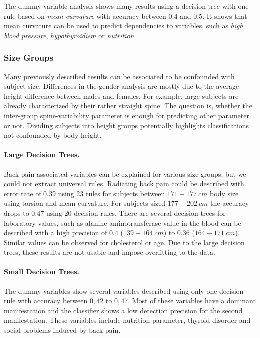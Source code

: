 \documentclass[a4paper,twoside]{style/article}
\begin{document}
The dummy variable analysis shows many results using a decision tree with one rule based on \emph{mean curvature} with accuracy between $0.4$ and $0.5$.
It shows that mean curvature can be used to predict dependencies to variables, such as \emph{high blood pressure}, \emph{hypothyroidism} or \emph{nutrition}.

\subsubsection{Size Groups}
Many previously described results can be associated to be confounded with subject size.
Differences in the gender analysis are mostly due to the average height difference between males and females.
For example, large subjects are already characterized by their rather straight spine.
%
The question is, whether the inter-group spine-variability parameter is enough for predicting other parameter or not.
Dividing subjects into height groups potentially highlights classifications not confounded by body-height.
\paragraph{Large Decision Trees. }
Back-pain associated variables can be explained for various size-groups, but we could not extract universal rules.
Radiating back pain could be described with error rate of $0.39$ using 23 rules for subjects between $171-177~cm$ body size using torsion and mean-curvature.
For subjects sized $177-202~cm$ the accuracy drops to $0.47$ using 20  decision rules.
There are several decision trees for laboratory values, such as alanine aminotransferase value in the blood can be described with a high precision of $0.4$ ($139-164~cm$) to $0.36$ ($164 - 171~cm$).
Similar values can be observed for cholesterol or age.
Due to the large decision trees, these results are not usable and impose overfitting to the data.
\paragraph{Small Decision Trees. }
The dummy variables show several variables described using only one decision rule with accuracy between $0,42$ to $0,47$.
Most of these variables have a dominant manifestation and the classifier shows a low detection precision for the second manifestation.
These variables include nutrition parameter, thyroid disorder and social problems induced by back pain.
\end{document}
